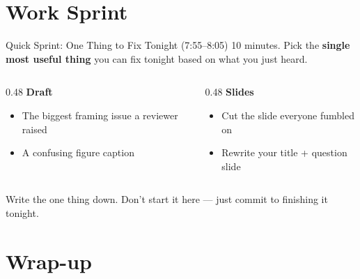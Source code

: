 \section{Work Sprint}

\begin{frame}{Quick Sprint: One Thing to Fix Tonight (7:55--8:05)}
  10 minutes. Pick the \textbf{single most useful thing} you can fix tonight based on what you just heard.

  \vspace{8pt}

  \begin{columns}[T]
    \begin{column}{0.48\textwidth}
      \textbf{\textcolor{usfgreen}{Draft}}
      \begin{itemize}\setlength\itemsep{1pt}
        \item The biggest framing issue a reviewer raised
        \item A confusing figure caption
      \end{itemize}
    \end{column}
    \begin{column}{0.48\textwidth}
      \textbf{\textcolor{usfgreen}{Slides}}
      \begin{itemize}\setlength\itemsep{1pt}
        \item Cut the slide everyone fumbled on
        \item Rewrite your title + question slide
      \end{itemize}
    \end{column}
  \end{columns}

  \vspace{10pt}

  Write the one thing down. Don't start it here --- just commit to finishing it tonight.
\end{frame}

\section{Wrap-up}

